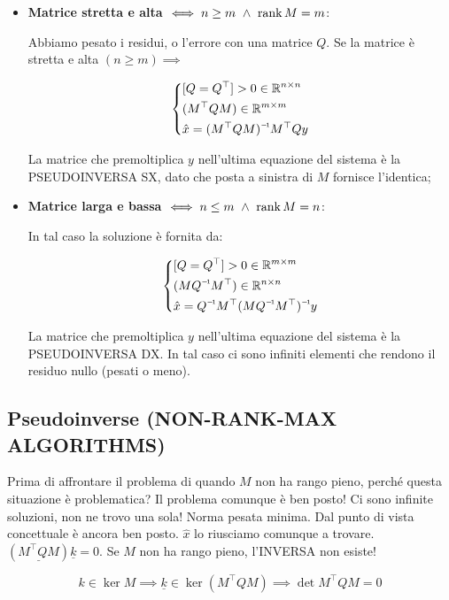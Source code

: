 \begin{itemize} 

\item{\textbf{Matrice stretta e alta $\iff n\geq m\ \land\ \rank{M}=m$}}:

Abbiamo pesato i residui, o l'errore con una matrice $Q$. Se la matrice è stretta e alta $(n\geq m) \implies$

\[	
	\left\{
	\begin{aligned}
	&[Q=Q^\top]>0\in\R^{n\times n}\\
	&(M^\top QM)\in\R^{m\times m}\\
	&\hat{x}=\inv{(M^\top QM)}M^\top Qy
	\end{aligned}
	\right.
\]

La matrice che premoltiplica $y$ nell'ultima equazione del sistema è la PSEUDOINVERSA SX, dato che posta a sinistra di $M$ fornisce l'identica;

\item{\textbf{Matrice larga e bassa $\iff n\leq m\ \land\ \rank{M}=n$}}:

In tal caso la soluzione è fornita da:

\[
	\left\{
	\begin{aligned}
	&[Q=Q^\top]>0\in\R^{m\times m}\\
	&(M\inv{Q}M^\top)\in\R^{n\times n}\\
	&\hat{x}=\inv{Q}M^\top \inv{(M\inv{Q}M^\top)}y
	\end{aligned}
	\right.
\]

La matrice che premoltiplica $y$ nell'ultima equazione del sistema è la PSEUDOINVERSA DX. In tal caso ci sono infiniti elementi che rendono il residuo nullo (pesati o meno). 

\end{itemize}

\subsection{Pseudoinverse (NON-RANK-MAX ALGORITHMS)}

Prima di affrontare il problema di quando $M$ non ha rango pieno, perché questa situazione è problematica? Il problema comunque è ben posto! Ci sono infinite soluzioni, non ne trovo una sola! Norma pesata minima. Dal punto di vista concettuale è ancora ben posto. $\hat{x}$ lo riusciamo comunque a trovare. $(\underline{M^\top QM})\underline{k}=0$. Se $M$ non ha rango pieno, l'INVERSA non esiste!

\[
	k\in\ker{M} \implies \underline{k}\in\ker{(M^\top QM)} \implies \det{M^\top QM}=0
\]

